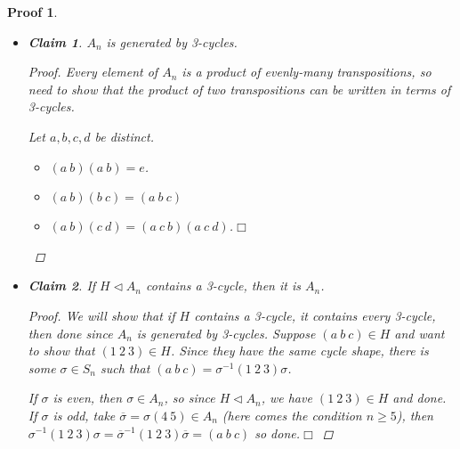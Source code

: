 \documentclass{article}
\theoremstyle{plain}\theoremheaderfont{\normalfont\itshape}\theorembodyfont{\rmfamily}\theoremseparator{.}\newtheorem*{rem}{Remark}\newtheorem*{ex}{Example}\newtheorem*{proof}{Proof}\newtheorem*{altp}{Alternative proof}\newtheorem*{nonex}{Non-Example}
\theoremstyle{plain}\theoremheaderfont{\normalfont\bfseries}\theorembodyfont{\rmfamily}\theoremseparator{.}\newtheorem{thm}{Theorem}[section]\newtheorem{lem}[thm]{Lemma}\newtheorem{prop}[thm]{Proposition}\newtheorem*{cor}{Corollary}\newtheorem{defn}[thm]{Definition}\newtheorem{clm}[thm]{Claim}\newtheorem{clminproof}{Claim}\newtheorem*{notn}{Notation}\newtheorem*{exer}{Exercise}\newtheorem*{lemnn}{Lemma}
\theoremstyle{break}\theoremheaderfont{\normalfont\itshape}\theorembodyfont{\rmfamily}\theoremseparator{.\medskip}\newtheorem*{proofskip}{Proof}\newtheorem*{exs}{Examples}\newtheorem*{rems}{Remarks}\newtheorem*{obs}{Observations}
\theoremstyle{break}\theoremheaderfont{\normalfont\bfseries}\theorembodyfont{\rmfamily}\theoremseparator{.\medskip}\newtheorem{lemskip}[thm]{Lemma}\newtheorem{defnskip}[thm]{Definition}\newtheorem{propskip}[thm]{Proposition}\newtheorem{thmskip}[thm]{Theorem}
\numberwithin{equation}{section}
\newcommand{\qed}{\hfill\ensuremath{\Box}}
\begin{document}
    \begin{proofskip}
        \begin{itemize}[topsep=0pt,parsep=1em,rightmargin=20pt]
            \item \begin{clminproof}
                \(A_n\) is generated by 3-cycles.
            \end{clminproof}
        \begin{proof}
                Every element of \(A_n\) is a product of evenly-many transpositions, so need to show that the product of two transpositions can be written in terms of 3-cycles.

                Let \(a,b,c,d\) be distinct.
                \begin{itemize}[topsep=0pt]
                    \item \((a \ b)(a \ b)=e\).
                    \item \((a \ b)(b \ c)=(a \ b \ c)\)
                    \item \((a \ b)(c \ d)=(a \ c \ b)(a \ c \ d)\).\qed
                \end{itemize}
            \end{proof}
            \item \begin{clminproof}
                If \(H\lhd A_n\) contains a 3-cycle, then it is \(A_n\).
            \end{clminproof}
        \begin{proof}
                We will show that if \(H\) contains a 3-cycle, it contains every 3-cycle, then done since \(A_n\) is generated by 3-cycles. Suppose \((a \ b \ c)\in H\) and want to show that \((1 \ 2 \ 3)\in H\). Since they have the same cycle shape, there is some \(\sigma\in S_n\) such that \((a \ b \ c)=\sigma^{-1}(1 \ 2 \ 3)\sigma\).
                
                If \(\sigma\) is even, then \(\sigma\in A_n\), so since \(H\lhd A_n\), we have \((1 \ 2 \ 3)\in H\) and done. If \(\sigma\) is odd, take \(\overline{\sigma}=\sigma(4 \ 5)\in A_n\) (here comes the condition \(n\ge 5\)), then \(\sigma^{-1}(1 \ 2 \ 3)\sigma=\overline{\sigma}^{-1}(1 \ 2 \ 3)\overline{\sigma}=(a \ b \ c)\) so done.\qed
            \end{proof}
        \end{itemize}


\end{proofskip}
\end{document}
